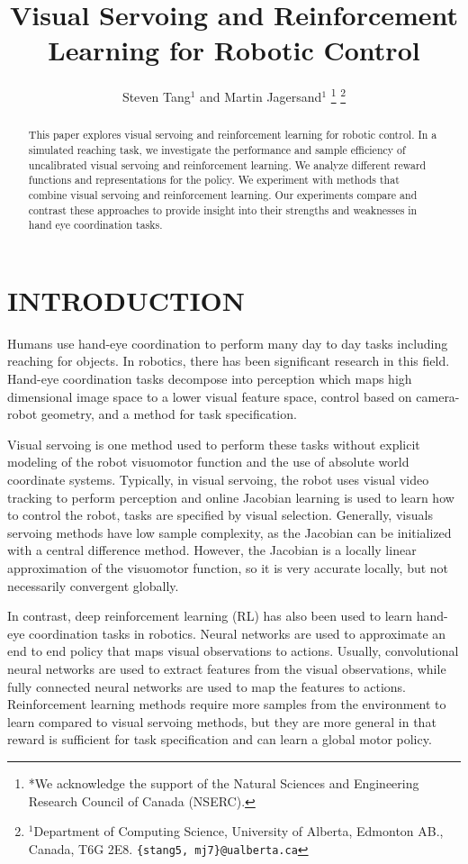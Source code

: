 \documentclass[letterpaper, 10 pt, conference]{ieeeconf}  %
\title{\LARGE \bf
Visual Servoing and Reinforcement Learning for Robotic Control
}
\author{Steven Tang$^{1}$ and Martin Jagersand$^{1}$%
\thanks{*We acknowledge the support of the Natural Sciences and Engineering Research
Council of Canada (NSERC).}%
\thanks{$^{1}$Department of Computing Science, University of Alberta, Edmonton
    AB., Canada, T6G 2E8. {\tt\small \{stang5, mj7\}@ualberta.ca}}%
}
\begin{document}
\maketitle
\thispagestyle{empty}
\pagestyle{empty}


\begin{abstract}
    This paper explores visual servoing and reinforcement learning for robotic
    control. In a simulated reaching task, we investigate the performance and
    sample efficiency of uncalibrated visual servoing and reinforcement
    learning. We analyze different reward functions and representations for the
    policy. We experiment with methods that combine visual servoing and
    reinforcement learning. Our experiments compare and contrast these
    approaches to provide insight into their strengths and weaknesses
    in hand eye coordination tasks.
\end{abstract}


\section{INTRODUCTION}

Humans use hand-eye coordination to perform many day to day tasks including
reaching for objects. In robotics, there has been significant research in this
field. Hand-eye coordination tasks decompose into perception
which maps high dimensional image space to a lower visual feature space,
control based on camera-robot geometry, and a method for task specification.

Visual servoing is one method used to perform these tasks without explicit
modeling of the robot visuomotor function and the use of absolute world
coordinate systems. Typically, in visual servoing, the robot uses visual video
tracking to perform perception and online Jacobian learning is used to learn how
to control the robot, tasks are specified by visual selection.
\cite{Jagersand1995} Generally, visuals servoing methods have low sample
complexity, as the Jacobian can be initialized with a central difference method.
However, the Jacobian is a locally linear approximation of the visuomotor
function, so it is very accurate locally, but not necessarily convergent
globally.

In contrast, deep reinforcement learning (RL) has also been used to learn hand-eye
coordination tasks in robotics. \cite{Levine15} Neural networks are used to approximate
an end to end policy that maps visual observations to actions. Usually, convolutional
neural networks are used to extract features from the visual observations, while fully
connected neural networks are used to map the features to actions. Reinforcement
learning methods require more samples from the environment to learn compared to visual
servoing methods, but they are more general in that reward is sufficient for task
specification and can learn a global motor policy.
\end{document}
